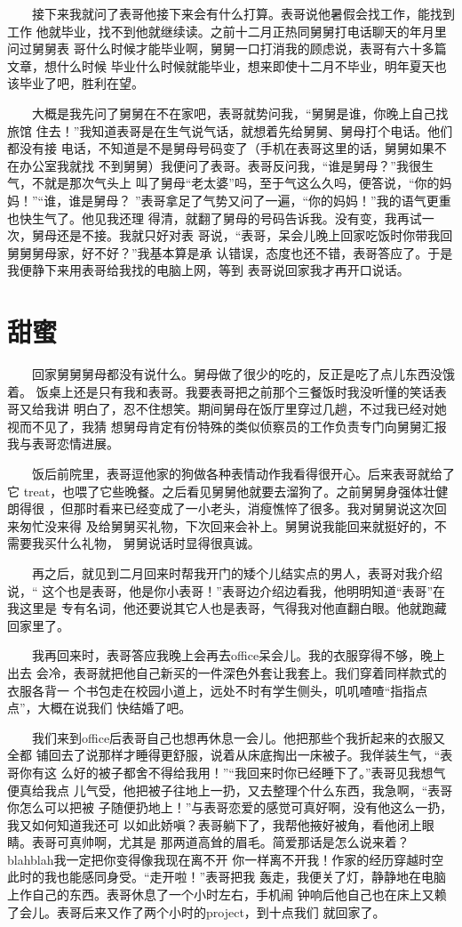 \documentclass[12pt]{book}
\begin{document}
　　接下来我就问了表哥他接下来会有什么打算。表哥说他暑假会找工作，能找到工作
他就毕业，找不到他就继续读。之前十二月正热同舅舅打电话聊天的年月里问过舅舅表
哥什么时候才能毕业啊，舅舅一口打消我的顾虑说，表哥有六十多篇文章，想什么时候
毕业什么时候就能毕业，想来即使十二月不毕业，明年夏天也该毕业了吧，胜利在望。

　　大概是我先问了舅舅在不在家吧，表哥就势问我，“舅舅是谁，你晚上自己找旅馆
住去！”我知道表哥是在生气说气话，就想着先给舅舅、舅母打个电话。他们都没有接
电话，不知道是不是舅母号码变了（手机在表哥这里的话，舅舅如果不在办公室我就找
不到舅舅）我便问了表哥。表哥反问我，“谁是舅母？”我很生气，不就是那次气头上
叫了舅母“老太婆”吗，至于气这么久吗，便答说，“你的妈妈！”“谁，谁是舅母？
”表哥拿足了气势又问了一遍，“你的妈妈！”我的语气更重也快生气了。他见我还理
得清，就翻了舅母的号码告诉我。没有变，我再试一次，舅母还是不接。我就只好对表
哥说，“表哥，呆会儿晚上回家吃饭时你带我回舅舅舅母家，好不好？”我基本算是承
认错误，态度也还不错，表哥答应了。于是我便静下来用表哥给我找的电脑上网，等到
表哥说回家我才再开口说话。
\section{甜蜜}
\label{sec-8-11}

　　回家舅舅舅母都没有说什么。舅母做了很少的吃的，反正是吃了点儿东西没饿着。
饭桌上还是只有我和表哥。我要表哥把之前那个三餐饭时我没听懂的笑话表哥又给我讲
明白了，忍不住想笑。期间舅母在饭厅里穿过几趟，不过我已经对她视而不见了，我猜
想舅母肯定有份特殊的类似侦察员的工作负责专门向舅舅汇报我与表哥恋情进展。

　　饭后前院里，表哥逗他家的狗做各种表情动作我看得很开心。后来表哥就给了它
treat，也喂了它些晚餐。之后看见舅舅他就要去溜狗了。之前舅舅身强体壮健朗得很
，但那时看来已经变成了一小老头，消瘦憔悴了很多。我对舅舅说这次回来匆忙没来得
及给舅舅买礼物，下次回来会补上。舅舅说我能回来就挺好的，不需要我买什么礼物，
舅舅说话时显得很真诚。

　　再之后，就见到二月回来时帮我开门的矮个儿结实点的男人，表哥对我介绍说，“
这个也是表哥，他是你小表哥！”表哥边介绍边看我，他明明知道“表哥”在我这里是
专有名词，他还要说其它人也是表哥，气得我对他直翻白眼。他就跑藏回家里了。

　　我再回来时，表哥答应我晚上会再去office呆会儿。我的衣服穿得不够，晚上出去
会冷，表哥就把他自己新买的一件深色外套让我套上。我们穿着同样款式的衣服各背一
个书包走在校园小道上，远处不时有学生侧头，叽叽喳喳“指指点点”，大概在说我们
快结婚了吧。

　　我们来到office后表哥自己也想再休息一会儿。他把那些个我折起来的衣服又全都
铺回去了说那样才睡得更舒服，说着从床底掏出一床被子。我佯装生气，“表哥你有这
么好的被子都舍不得给我用！”“我回来时你已经睡下了。”表哥见我想气便真给我点
儿气受，他把被子往地上一扔，又去整理个什么东西，我急啊，“表哥你怎么可以把被
子随便扔地上！”与表哥恋爱的感觉可真好啊，没有他这么一扔，我又如何知道我还可
以如此娇嗔？表哥躺下了，我帮他掖好被角，看他闭上眼睛。表哥可真帅啊，尤其是 
那两道高耸的眉毛。简爱那话是怎么说来着？blahblah我一定把你变得像我现在离不开
你一样离不开我！作家的经历穿越时空此时的我也能感同身受。“走开啦！”表哥把我
轰走，我便关了灯，静静地在电脑上作自己的东西。表哥休息了一个小时左右，手机闹
钟响后他自己也在床上又赖了会儿。表哥后来又作了两个小时的project，到十点我们
就回家了。
\end{document}
